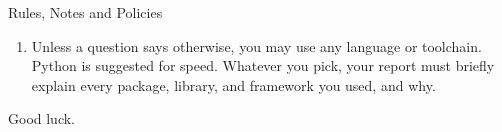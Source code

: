 \begin{neobox}[neotitlefont=\pixelfont]{Rules, Notes and Policies}
\begin{enumerate}
        \item Unless a question says otherwise, you may use any language or
              toolchain. Python is suggested for speed. Whatever you pick,
              your report must briefly explain every package, library, and
              framework you used, and why.
    \end{enumerate}

    \vspace{1cm}

    Good luck.

\end{neobox}
